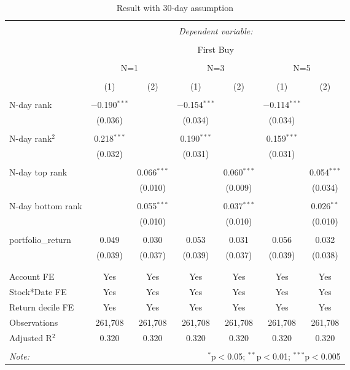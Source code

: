
\begin{table}[!htbp] \centering 
  \caption{Result with 30-day assumption} 
  \label{} 
\begin{tabular}{@{\extracolsep{5pt}}lcccccc} 
\\[-1.8ex]\hline 
\hline \\[-1.8ex] 
 & \multicolumn{6}{c}{\textit{Dependent variable:}} \\ 
\cline{2-7} 
\\[-1.8ex] & \multicolumn{6}{c}{First Buy} \\ 
\\[-1.8ex] & \multicolumn{2}{c}{N=1}& \multicolumn{2}{c}{N=3}& \multicolumn{2}{c}{N=5} \\
\cmidrule(lr){2-3}
\cmidrule(lr){4-5}
\cmidrule(lr){6-7}
\\[-1.8ex] & (1) & (2) & (1) & (2) & (1) & (2)\\ 
\hline \\[-1.8ex]
  N-day rank & $-$0.190$^{***}$ &  & $-$0.154$^{***}$ &  & $-$0.114$^{***}$ &  \\ 
  & (0.036) &  & (0.034) &  & (0.034) &  \\ 
  & & & & & & \\  
  N-day rank$^2$  & 0.218$^{***}$ &  & 0.190$^{***}$ &  & 0.159$^{***}$ &  \\ 
  & (0.032) &  & (0.031) &  & (0.031) &  \\ 
  & & & & & & \\ 
  N-day top rank &  & 0.066$^{***}$ &  & 0.060$^{***}$ &  & 0.054$^{***}$ \\ 
  &  & (0.010) &  & (0.009) &  & (0.034) \\ 
  & & & & & & \\ 
  N-day bottom rank &  & 0.055$^{***}$ &  & 0.037$^{***}$ &  & 0.026$^{**}$ \\ 
  &  & (0.010) &  & (0.010) &  & (0.010) \\ 
  & & & & & & \\ 
 portfolio\_return & 0.049 & 0.030 & 0.053 & 0.031 & 0.056 & 0.032 \\ 
  & (0.039) & (0.037) & (0.039) & (0.037) & (0.039) & (0.038) \\ 
  & & & & & & \\ 
\hline \\[-1.8ex] 
Account FE & Yes & Yes & Yes & Yes & Yes & Yes \\ 
Stock*Date FE & Yes & Yes & Yes & Yes & Yes & Yes \\ 
Return decile FE & Yes & Yes & Yes & Yes & Yes & Yes \\ 
Observations & 261,708 & 261,708 & 261,708 & 261,708 & 261,708 & 261,708 \\ 
Adjusted R$^{2}$ & 0.320 & 0.320 & 0.320 & 0.320 & 0.320 & 0.320 \\ 
\hline 
\hline \\[-1.8ex] 
\textit{Note:}  & \multicolumn{6}{r}{$^{*}$p$<$0.05; $^{**}$p$<$0.01; $^{***}$p$<$0.005} \\ 
\end{tabular} 
\end{table} 
